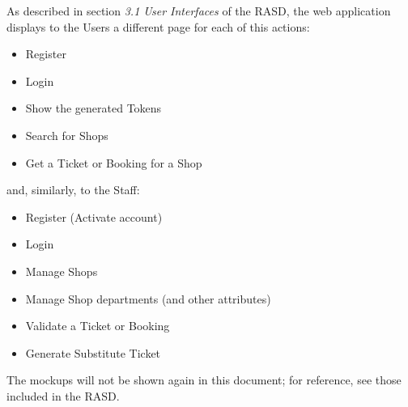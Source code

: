 As described in section \emph{3.1 User Interfaces} of the RASD, the web application displays to the Users a different page for each of this actions:
\begin{itemize}
    \item Register
    \item Login
    \item Show the generated Tokens
    \item Search for Shops
    \item Get a Ticket or Booking for a Shop
\end{itemize}
and, similarly, to the Staff:
\begin{itemize}
    \item Register (Activate account)
    \item Login
    \item Manage Shops
    \item Manage Shop departments (and other attributes)
    \item Validate a Ticket or Booking
    \item Generate Substitute Ticket
\end{itemize}
The mockups will not be shown again in this document; for reference, see those included in the RASD.


